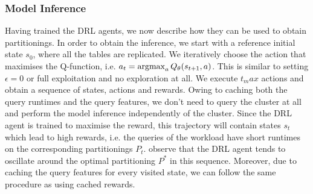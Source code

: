 \subsubsection{Model Inference}
Having trained the DRL agents, we now describe how they can be used to obtain partitionings. In order to obtain the inference, we start with a reference initial state $s_0$, where all the tables are replicated. We iteratively choose the action that maximises the Q-function, i.e. $a_t = \operatorname*{argmax}_aQ_\theta(s_{t+1},a)$. This is similar to setting $\epsilon = 0$ or full exploitation and no exploration at all. We execute $t_max$ actions and obtain a sequence of states, actions and rewards. Owing to caching both the query runtimes and the query features, we don't need to query the cluster at all and perform the model inference independently of the cluster. Since the DRL agent is trained to maximise the reward, this trajectory will contain states $s_t$ which lead to high rewards, i.e. the queries of the workload have short runtimes on the corresponding partitionings $P_t$. \citeauthor{Hilprecht:2019:TLP:3329859.3329876} observe that the DRL agent tends to oscillate around the optimal partitioning $P^*$ in this sequence. Moreover, due to caching the query features for every visited state, we can follow the same procedure as using cached rewards.
